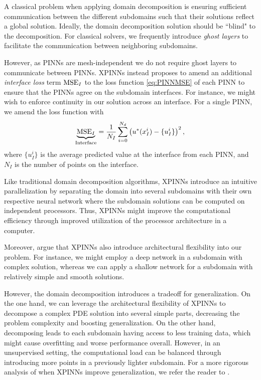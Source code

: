 A classical problem when applying domain decomposition is ensuring sufficient communication between the different subdomains such that their solutions reflect a global solution.
Ideally, the domain decomposition solution should be ``blind" to the decomposition.
For classical solvers, we frequently introduce \textit{ghost layers} to facilitate the communication between neighboring subdomains. 

However, as PINNs are mesh-independent we do not require ghost layers to communicate between PINNs.
XPINNs instead proposes to amend an additional \textit{interface loss} term $\operatorname{MSE}_I$ to the loss function \eqref{eq:PINNMSE} of each PINN to ensure that the PINNs agree on the subdomain interfaces.
For instance, we might wish to enforce continuity in our solution across an interface.
For a single PINN, we amend the loss function with
\begin{equation}\label{eq:MSE_I}
    \underbrace{\operatorname{MSE}_I}_{\text{Interface}} = \frac{1}{N_I} \sum_{i = 0}^{N_d} \left( u^*(x_I^i) - \{u_I^i\} \right)^2,  \\
\end{equation}
where $\{u_I^i\}$ is the average predicted value at the interface from each PINN, and $N_I$ is the number of points on the interface. 

Like traditional domain decomposition algorithms, XPINNs introduce an intuitive parallelization by separating the domain into several subdomains with their own respective neural network where the subdomain solutions can be computed on independent processors.
Thus, XPINNs might improve the computational efficiency through improved utilization of the processor architecture in a computer.

Moreover, \textcite{Jagtap2020ExtendedPN} argue that XPINNs also introduce architectural flexibility into our problem.
For instance, we might employ a deep network in a subdomain with complex solution, whereas we can apply a shallow network for a subdomain with relatively simple and smooth solutions. 

However, the domain decomposition introduces a tradeoff for generalization.
On the one hand, we can leverage the architectural flexibility of XPINNs to decompose a complex PDE solution into several simple parts, decreasing the problem complexity and boosting generalization.
On the other hand, decomposing leads to each subdomain having access to less training data, which might cause overfitting and worse performance overall.
However, in an unsupervised setting, the computational load can be balanced through introducing more points in a previously lighter subdomain.
For a more rigorous analysis of when XPINNs improve generalization, we refer the reader to \cite{XPINN_generalize}.

